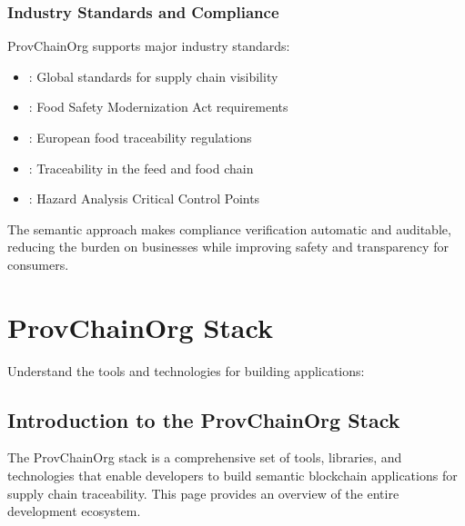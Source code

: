 \documentclass[letterpaper,10pt,english]{sphinxmanual}
\begin{document}
\subsubsection{Industry Standards and Compliance}
\label{\detokenize{foundational/intro-to-supply-chain-traceability:industry-standards-and-compliance}}
\sphinxAtStartPar
ProvChainOrg supports major industry standards:
\begin{itemize}
\item {} 
\sphinxAtStartPar
{}: Global standards for supply chain visibility

\item {} 
\sphinxAtStartPar
{}: Food Safety Modernization Act requirements

\item {} 
\sphinxAtStartPar
{}: European food traceability regulations

\item {} 
\sphinxAtStartPar
{}: Traceability in the feed and food chain

\item {} 
\sphinxAtStartPar
{}: Hazard Analysis Critical Control Points

\end{itemize}

\sphinxAtStartPar
The semantic approach makes compliance verification automatic and auditable, reducing the burden on businesses while improving safety and transparency for consumers.


\section{ProvChainOrg Stack}
\label{\detokenize{index:provchainorg-stack}}
\sphinxAtStartPar
Understand the tools and technologies for building applications:

\sphinxstepscope


\subsection{Introduction to the ProvChainOrg Stack}
\label{\detokenize{stack/intro-to-stack:introduction-to-the-provchainorg-stack}}\label{\detokenize{stack/intro-to-stack::doc}}
\sphinxAtStartPar
The ProvChainOrg stack is a comprehensive set of tools, libraries, and technologies that enable developers to build semantic blockchain applications for supply chain traceability. This page provides an overview of the entire development ecosystem.
\end{document}
